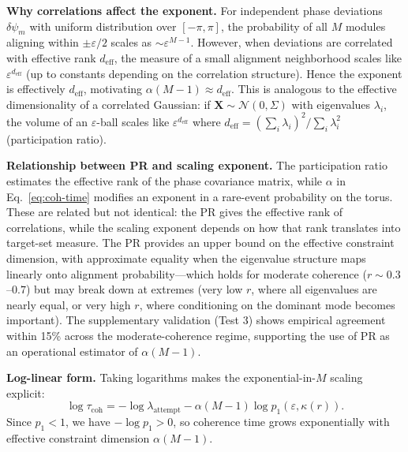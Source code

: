 \documentclass[12pt]{article}
\begin{document}
\textbf{Why correlations affect the exponent.}
For independent phase deviations $\delta\psi_m$ with uniform distribution over $[-\pi, \pi]$,
the probability of all $M$ modules aligning within $\pm\varepsilon/2$ scales as $\sim \varepsilon^{M-1}$.
However, when deviations are correlated with effective rank $d_{\mathrm{eff}}$,
the measure of a small alignment neighborhood scales like $\varepsilon^{d_{\mathrm{eff}}}$
(up to constants depending on the correlation structure).
Hence the exponent is effectively $d_{\mathrm{eff}}$, motivating $\alpha(M-1) \approx d_{\mathrm{eff}}$.
This is analogous to the effective dimensionality of a correlated Gaussian:
if $\mathbf{X} \sim \mathcal{N}(0, \Sigma)$ with eigenvalues $\lambda_i$,
the volume of an $\varepsilon$-ball scales like $\varepsilon^{d_{\mathrm{eff}}}$ where
$d_{\mathrm{eff}} = (\sum_i \lambda_i)^2 / \sum_i \lambda_i^2$ (participation ratio).

\textbf{Relationship between PR and scaling exponent.} The participation ratio estimates the effective rank of the phase covariance matrix, while $\alpha$ in Eq.~\ref{eq:coh-time} modifies an exponent in a rare-event probability on the torus. These are related but not identical: the PR gives the effective rank of correlations, while the scaling exponent depends on how that rank translates into target-set measure. The PR provides an upper bound on the effective constraint dimension, with approximate equality when the eigenvalue structure maps linearly onto alignment probability---which holds for moderate coherence ($r \sim 0.3$--$0.7$) but may break down at extremes (very low $r$, where all eigenvalues are nearly equal, or very high $r$, where conditioning on the dominant mode becomes important). The supplementary validation (Test 3) shows empirical agreement within 15\% across the moderate-coherence regime, supporting the use of PR as an operational estimator of $\alpha(M-1)$.

\textbf{Log-linear form.} Taking logarithms makes the exponential-in-$M$ scaling explicit:
\[
\log \tau_{\mathrm{coh}} = -\log \lambda_{\mathrm{attempt}} - \alpha(M-1)\log p_1(\varepsilon, \kappa(r)).
\]
Since $p_1 < 1$, we have $-\log p_1 > 0$, so coherence time grows exponentially with effective constraint dimension $\alpha(M-1)$.
\end{document}
